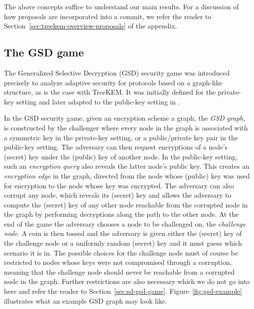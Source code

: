 The above concepts suffice to understand our main results. For a discussion of how proposals are incorporated into a commit, we refer the reader to Section~\ref{sec:treekem-overview-proposals} of the appendix.

\subsection{The GSD game} \label{sec:gsd-intro}

The Generalized Selective Decryption (GSD) security game \cite{gsd} was introduced precisely to analyze adaptive security for protocols based on a graph-like structure, as is the case with TreeKEM. It was initially defined for the private-key setting and later adapted to the public-key setting in \cite{ttkem}.

In the GSD security game, given an encryption scheme a graph, the \emph{GSD graph}, is constructed by the challenger where every node in the graph is associated with a symmetric key in the private-key setting, or a public/private key pair in the public-key setting. The adversary can then request encryptions of a node's (secret) key under the (public) key of another node. In the public-key setting, such an \emph{encryption query} also reveals the latter node's public key. This creates an \emph{encryption edge} in the graph, directed from the node whose (public) key was used for encryption to the node whose key was encrypted. The adversary can also corrupt any node, which reveals its (secret) key and allows the adversary to compute the (secret) key of any other node reachable from the corrupted node in the graph by performing decryptions along the path to the other node. At the end of the game the adversary chooses a node to be challenged on, the \emph{challenge node}. A coin is then tossed and the adversary is given either the (secret) key of the challenge node or a uniformly random (secret) key and it must guess which scenario it is in. The possible choices for the challenge node must of course be restricted to nodes whose keys were not compromised through a corruption, meaning that the challenge node should never be reachable from a corrupted node in the graph. Further restrictions are also necessary which we do not go into here and refer the reader to Section~\ref{sec:sd-gsd-game}. Figure~\ref{fig:gsd-example} illustrates what an example GSD graph may look like.

